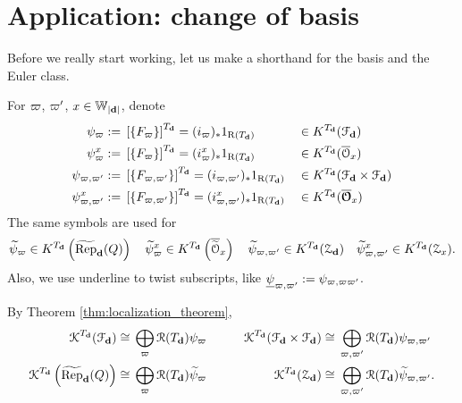 \section{Application: change of basis}
Before we really start working, let us make a shorthand for the basis and the Euler class.

\begin{defn}\label{def:localization_basis}
For $\varpi$, $\varpi'$, $x \in \mathbb{W}_{|\mathbf{d}|}$, denote
\begin{equation*}
\begin{aligned}
  \psi_{\varpi}:=\;& \left[\{F_{\varpi}\} \right]^{T_{\mathbf{d}}} = (i_{\varpi})_{*} 1_{\operatorname{\operatorname{R}}(T_{\mathbf{d}})} && \in K^{T_{\mathbf{d}}} (\mathcal{F}_{\mathbf{d}}) \\ 
  \psi_{\varpi}^{x}:=\;& \left[\{F_{\varpi}\} \right]^{T_{\mathbf{d}}} = (i_{\varpi}^x)_{*} 1_{\operatorname{\operatorname{R}}(T_{\mathbf{d}})} && \in K^{T_{\mathbf{d}}} (\overline{\mathcal{O}}_x) \\ 
  \psi_{\varpi,\varpi'}:=\;& \left[\{F_{\varpi,\varpi'}\} \right]^{T_{\mathbf{d}}} = (i_{\varpi,\varpi'})_{*} 1_{\operatorname{\operatorname{R}}(T_{\mathbf{d}})} && \in K^{T_{\mathbf{d}}} (\mathcal{F}_{\mathbf{d}} \times \mathcal{F}_{\mathbf{d}} ) \\ 
  \psi_{\varpi,\varpi'}^{x}:=\;& \left[\{F_{\varpi,\varpi'}\} \right]^{T_{\mathbf{d}}} = (i_{\varpi,\varpi'}^{x})_{*} 1_{\operatorname{\operatorname{R}}(T_{\mathbf{d}})} && \in K^{T_{\mathbf{d}}} (\overline{\boldsymbol{\mathcal{O}}}_x) \\ 
\end{aligned}
\end{equation*}
The same symbols are used for 
$$\widetilde{\psi}_{\varpi} \in K^{T_{\mathbf{d}}} \left( \operatorname{\widetilde{\operatorname{Rep}}}_{\mathbf{d}}(Q) \right)  \quad  \widetilde{\psi}_{\varpi}^{x} \in K^{T_{\mathbf{d}}} \left( \overline{\widetilde{\mathcal{O}}}_x \right)  \quad  \widetilde{\psi}_{\varpi,\varpi'} \in K^{T_{\mathbf{d}}} (\operatorname{\mathcal{Z}}_{\mathbf{d}})  \quad  \widetilde{\psi}_{\varpi,\varpi'}^{x} \in K^{T_{\mathbf{d}}} (\operatorname{\mathcal{Z}}_x).$$
Also, we use underline to twist subscripts, like $\underline{\psi}_{\varpi,\varpi'}:=\psi_{\varpi,\varpi\varpi'}$.
\end{defn}

By Theorem \ref{thm:localization_theorem},
\begin{equation*}
\begin{aligned}
   \operatorname{\operatorname{\mathcal{K}}}^{T_{\mathbf{d}}} (\mathcal{F}_{\mathbf{d}}) \cong\;& \bigoplus_{\varpi} \operatorname{\operatorname{\mathcal{R}}}(T_{\mathbf{d}}) \psi_{\varpi}\qquad & \operatorname{\operatorname{\mathcal{K}}}^{T_{\mathbf{d}}} (\mathcal{F}_{\mathbf{d}} \times \mathcal{F}_{\mathbf{d}} ) \cong\;& \bigoplus_{\varpi,\varpi'} \operatorname{\operatorname{\mathcal{R}}}(T_{\mathbf{d}}) \psi_{\varpi,\varpi'} \\ 
   \operatorname{\operatorname{\mathcal{K}}}^{T_{\mathbf{d}}} \left(\operatorname{\widetilde{\operatorname{Rep}}}_{\mathbf{d}}(Q)\right) \cong\;& \bigoplus_{\varpi} \operatorname{\operatorname{\mathcal{R}}}(T_{\mathbf{d}}) \widetilde{\psi}_{\varpi} & \operatorname{\operatorname{\mathcal{K}}}^{T_{\mathbf{d}}} (\operatorname{\mathcal{Z}}_{\mathbf{d}} ) \cong\;& \bigoplus_{\varpi,\varpi'} \operatorname{\operatorname{\mathcal{R}}}(T_{\mathbf{d}}) \widetilde{\psi}_{\varpi,\varpi'}. \\ 
\end{aligned}
\end{equation*}

